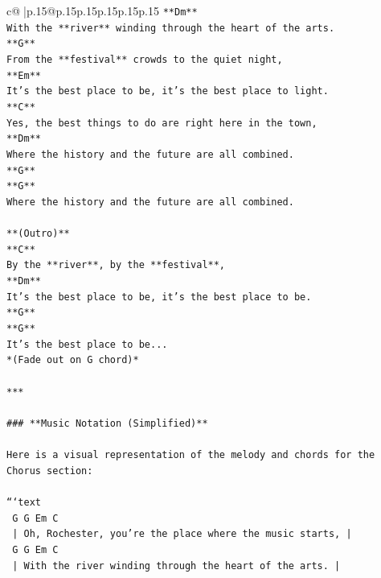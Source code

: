 \documentclass{article}
\begin{document}
{\begin{supertabular}{c@{$\;$}|p{.15\linewidth}@{}p{.15\linewidth}p{.15\linewidth}p{.15\linewidth}p{.15\linewidth}p{.15\linewidth}}
{{{\texttt{**Dm**} \\
\texttt{With the **river** winding through the heart of the arts.} \\
\texttt{**G**} \\
\texttt{From the **festival** crowds to the quiet night,} \\
\texttt{**Em**} \\
\texttt{It's the best place to be, it's the best place to light.} \\
\texttt{**C**} \\
\texttt{Yes, the best things to do are right here in the town,} \\
\texttt{**Dm**} \\
\texttt{Where the history and the future are all combined.} \\
\texttt{**G**} \\
\texttt{**G**} \\
\texttt{Where the history and the future are all combined.} \\
\\ 
\texttt{**(Outro)**} \\
\texttt{**C**} \\
\texttt{By the **river**, by the **festival**,} \\
\texttt{**Dm**} \\
\texttt{It's the best place to be, it's the best place to be.} \\
\texttt{**G**} \\
\texttt{**G**} \\
\texttt{It's the best place to be...} \\
\texttt{*(Fade out on G chord)*} \\
\\ 
\texttt{***} \\
\\ 
\texttt{\#\#\# **Music Notation (Simplified)**} \\
\\ 
\texttt{Here is a visual representation of the melody and chords for the Chorus section:} \\
\\ 
\texttt{```text} \\
\texttt{  G          G          Em          C} \\
\texttt{  |  Oh, Rochester, you're the place where the music starts, |} \\
\texttt{  G          G          Em          C} \\
\texttt{  |  With the river winding through the heart of the arts. |} \\
}}}
\end{supertabular}}
\end{document}
